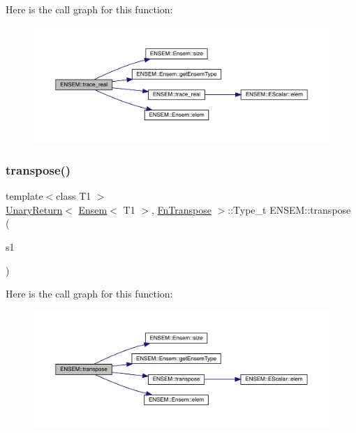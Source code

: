 Here is the call graph for this function\+:\nopagebreak
\begin{figure}[H]
\begin{center}
\leavevmode
\includegraphics[width=350pt]{d1/d9e/group__eensem_gad19d894f22555d78d30d2e186300fb11_cgraph}
\end{center}
\end{figure}
\mbox{\label{group__eensem_gae77f21b6732b95bacf62ceb754c5ac17}} 
\subsubsection{\texorpdfstring{transpose()}{transpose()}}
{\footnotesize\ttfamily template$<$class T1 $>$ \\
\mbox{\hyperlink{structENSEM_1_1UnaryReturn}{Unary\+Return}}$<$ \mbox{\hyperlink{classENSEM_1_1Ensem}{Ensem}}$<$ T1 $>$, \mbox{\hyperlink{structENSEM_1_1FnTranspose}{Fn\+Transpose}} $>$\+::Type\+\_\+t E\+N\+S\+E\+M\+::transpose (\begin{DoxyParamCaption}\item[{const \mbox{\hyperlink{classENSEM_1_1Ensem}{Ensem}}$<$ T1 $>$ \&}]{s1 }\end{DoxyParamCaption})\hspace{0.3cm}{\ttfamily [inline]}}

Here is the call graph for this function\+:\nopagebreak
\begin{figure}[H]
\begin{center}
\leavevmode
\includegraphics[width=350pt]{d1/d9e/group__eensem_gae77f21b6732b95bacf62ceb754c5ac17_cgraph}
\end{center}
\end{figure}
\mbox{\label{group__eensem_gac55277f43f9b655a1ae7d4599568d633}} 

